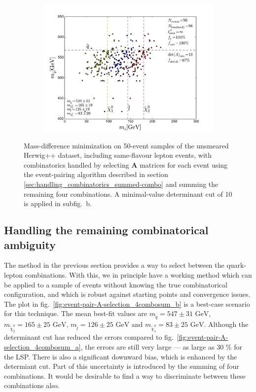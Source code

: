 \documentclass[twoside,english]{uiofysmaster}
\begin{document}
\begin{figure}[hbt]
	\begin{subfigure}[b]{0.6\textwidth}
		\includegraphics[width=\textwidth]{figures/improving_combinatorics/herwigpp-OSFL-50events_nosmear_detAcut10_A_matrix_algorithm_4combosum_TMP.pdf}
		\caption{ }
		\label{fig:event-pair-A-selection_4combosum-OSFL-50events_b} 
	\end{subfigure}
	\caption{Mass-difference minimization on 50-event samples of the unsmeared Herwig++ dataset, including same-flavour lepton events, with combinatorics handled by selecting $\mathbf{A}$ matrices for each event using the event-pairing algorithm described in section \ref{sec:handling_combinatorics_summed-combo} and summing the remaining four combinations. A minimal-value determinant cut of 10 is applied in subfig.\ b.}
	\label{fig:event-pair-A-selection_4combosum-OSFL-50events}
\end{figure}


\subsection{Handling the remaining combinatorical ambiguity}
The method in the previous section provides a way to select between the quark-lepton combinations. With this, we in principle have a working method which can be applied to a sample of events without knowing the true combinatorical configuration, and which is robust against starting points and convergence issues. The plot in fig.\ \ref{fig:event-pair-A-selection_4combosum_b} is a best-case scenario for this technique. The mean best-fit values are $m_{\tilde q} = 547 \pm 31 \,\,\mathrm{GeV}$, $m_{\tilde \chi_2^0} = 165\pm 25 \,\,\mathrm{GeV}$, $m_{\tilde l} = 126 \pm 25 \,\, \mathrm{GeV}$ and $m_{\tilde \chi_1^0} = 83 \pm 25 \,\,\mathrm{GeV}$. Although the determinant cut has reduced the errors compared to fig.\ \ref{fig:event-pair-A-selection_4combosum_a}, the errors are still very large --- as large as 30 \% for the LSP. There is also a significant downward bias, which is enhanced by the determiant cut. Part of this uncertainty is introduced by the summing of four combinations. It would be desirable to find a way to discriminate between these combinations also. 
\end{document}
